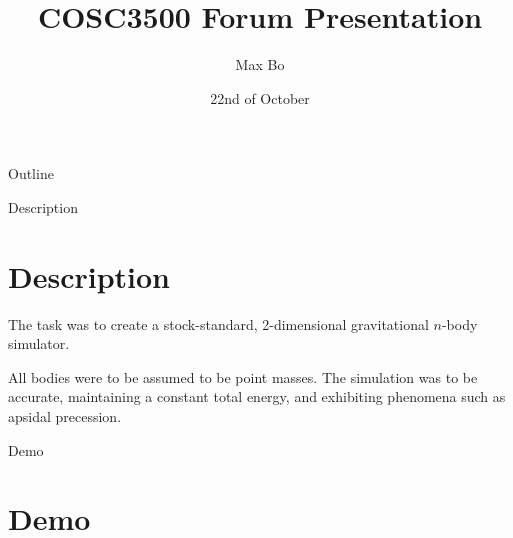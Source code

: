 \documentclass{beamer}
\title[Forum Presentation]{COSC3500 Forum Presentation}
\author{Max Bo}
\date{22nd of October}
\begin{document}
\begin{frame}
  \titlepage
\end{frame}





\begin{frame}{Outline}
 \tableofcontents
\end{frame}




\begin{frame}{Description}
\section{Description}
The task was to create a stock-standard, 2-dimensional gravitational $n$-body simulator. 

\vskip 1cm

All bodies were to be assumed to be point masses. The simulation was to be accurate, maintaining a constant total energy, and exhibiting phenomena such as apsidal precession. 
\end{frame}

\begin{frame}{Demo}
\section{Demo}
\end{frame}
\end{document}
